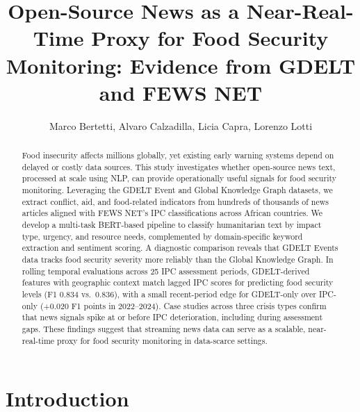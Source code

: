 \documentclass{article}
\title{Open-Source News as a Near-Real-Time Proxy for Food Security Monitoring: Evidence from GDELT and FEWS NET}
\author{Marco Bertetti, Alvaro Calzadilla, Licia Capra, Lorenzo Lotti}
\begin{document}
\date{}

\maketitle

\begin{abstract}
Food insecurity affects millions globally, yet existing early warning systems depend on delayed or costly data sources. This study investigates whether open-source news text, processed at scale using NLP, can provide operationally useful signals for food security monitoring. Leveraging the GDELT Event and Global Knowledge Graph datasets, we extract conflict, aid, and food-related indicators from hundreds of thousands of news articles aligned with FEWS NET's IPC classifications across African countries. We develop a multi-task BERT-based pipeline to classify humanitarian text by impact type, urgency, and resource needs, complemented by domain-specific keyword extraction and sentiment scoring. A diagnostic comparison reveals that GDELT Events data tracks food security severity more reliably than the Global Knowledge Graph. In rolling temporal evaluations across 25 IPC assessment periods, GDELT-derived features with geographic context match lagged IPC scores for predicting food security levels (F1 0.834 vs.\ 0.836), with a small recent-period edge for GDELT-only over IPC-only (+0.020 F1 points in 2022--2024). Case studies across three crisis types confirm that news signals spike at or before IPC deterioration, including during assessment gaps. These findings suggest that streaming news data can serve as a scalable, near-real-time proxy for food security monitoring in data-scarce settings.
\end{abstract}


\section{Introduction}
\end{document}
